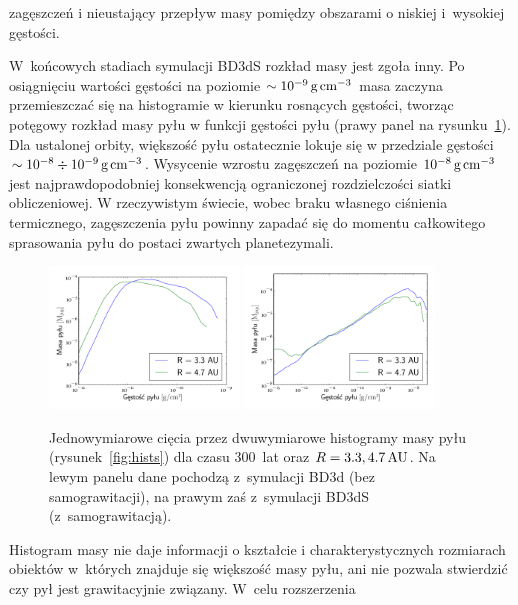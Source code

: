 zagęszczeń i nieustający przepływ masy pomiędzy obszarami o niskiej i~wysokiej
gęstości. 
\par W~końcowych stadiach symulacji BD3dS rozkład masy jest zgoła
inny. Po osiągnięciu wartości gęstości na poziomie $\sim10^{-9}\hbox{$\thinspace\textrm{g}$}\hbox{$\thinspace\textrm{cm}$}^{-3}$ masa
zaczyna przemieszczać się na histogramie w kierunku rosnących gęstości, tworząc
potęgowy rozkład masy pyłu w funkcji gęstości pyłu (prawy panel na
rysunku~\ref{fig:hists1d}). Dla ustalonej orbity, większość pyłu ostatecznie
lokuje się w przedziale gęstości $\sim10^{-8}\div10^{-9}\hbox{$\thinspace\textrm{g}$}\hbox{$\thinspace\textrm{cm}$}^{-3}$.  Wysycenie
wzrostu zagęszczeń na poziomie $10^{-8}\hbox{$\thinspace\textrm{g}$}\hbox{$\thinspace\textrm{cm}$}^{-3}$ jest najprawdopodobniej
konsekwencją ograniczonej rozdzielczości siatki obliczeniowej. W rzeczywistym
świecie, wobec braku własnego ciśnienia termicznego, zagęszczenia pyłu powinny
zapadać się do momentu całkowitego sprasowania pyłu do postaci zwartych
planetezymali.
%
\begin{figure} 
  \centering
  \includegraphics[width=0.45\textwidth]{figures/hist1d_nosg}
  \includegraphics[width=0.45\textwidth]{figures/hist1d_sg}
  \caption{Jednowymiarowe cięcia przez dwuwymiarowe histogramy masy pyłu
  (rysunek~\ref{fig:hists}) dla czasu 300~lat oraz $R = 3.3, 4.7\hbox{$\thinspace\textrm{AU}$}$. Na lewym
  panelu dane pochodzą z~symulacji BD3d (bez samograwitacji), na prawym zaś
  z~symulacji BD3dS (z~samograwitacją).}
  \label{fig:hists1d} 
\end{figure}
%
\par Histogram masy nie daje informacji o kształcie i charakterystycznych
rozmiarach obiektów w~których znajduje się większość masy pyłu, ani nie pozwala
stwierdzić czy pył jest grawitacyjnie związany. W~celu rozszerzenia
